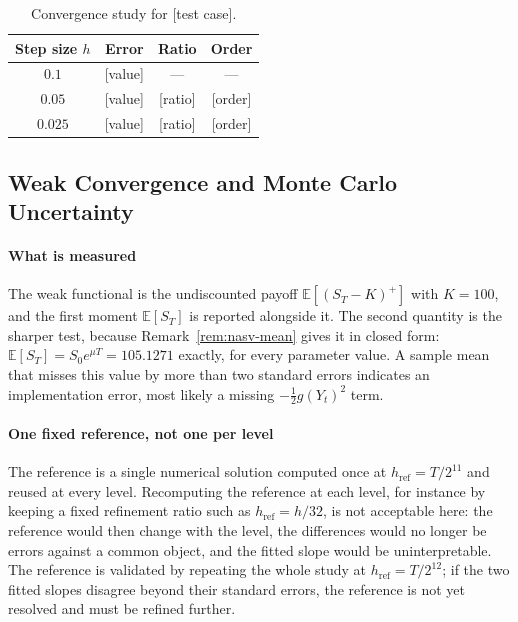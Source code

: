 \documentclass[11pt,a4paper]{article}
\theoremstyle{definition}
\theoremstyle{remark}
\begin{document}
\begin{table}[H]
\centering
\begin{tabular}{cccc}
\toprule
\textbf{Step size $h$} & \textbf{Error} & \textbf{Ratio} & \textbf{Order} \\
\midrule
$0.1$    & [value] & ---  & ---  \\
$0.05$   & [value] & [ratio] & [order] \\
$0.025$  & [value] & [ratio] & [order] \\
\bottomrule
\end{tabular}
\caption{Convergence study for [test case].}
\end{table}

\subsection{Weak Convergence and Monte Carlo Uncertainty}
\label{sec:weak}

\paragraph{What is measured}
The weak functional is the undiscounted payoff $\mathbb{E}[(S_T - K)^+]$ with $K = 100$, and the first moment $\mathbb{E}[S_T]$ is reported alongside it. The second quantity is the sharper test, because Remark~\ref{rem:nasv-mean} gives it in closed form: $\mathbb{E}[S_T] = S_0 e^{\mu T} = 105.1271$ exactly, for every parameter value. A sample mean that misses this value by more than two standard errors indicates an implementation error, most likely a missing $-\tfrac12 g(Y_t)^2$ term.

\paragraph{One fixed reference, not one per level}
The reference is a single numerical solution computed once at $h_{\mathrm{ref}} = T/2^{11}$ and reused at every level. Recomputing the reference at each level, for instance by keeping a fixed refinement ratio such as $h_{\mathrm{ref}} = h/32$, is not acceptable here: the reference would then change with the level, the differences would no longer be errors against a common object, and the fitted slope would be uninterpretable. The reference is validated by repeating the whole study at $h_{\mathrm{ref}} = T/2^{12}$; if the two fitted slopes disagree beyond their standard errors, the reference is not yet resolved and must be refined further.
\end{document}
